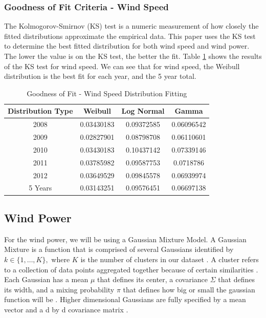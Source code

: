 \documentclass{IEEEtran}
\begin{document}
  \subsubsection{Goodness of Fit Criteria - Wind Speed}

  The Kolmogorov-Smirnov (KS) test is a numeric measurement of how closely the fitted distributions approximate the empirical data. This paper uses the KS test to determine the best fitted distribution for both wind speed and wind power. The lower the value is on the KS test, the better the fit. Table \ref{tab:distributions} shows the results of the KS test for wind speed. We can see that for wind speed, the Weibull distribution is the best fit for each year, and the 5 year total.

  \begin{table}
    \centering
    \caption{Goodness of Fit - Wind Speed Distribution Fitting}
    \begin{tabular}{c c c c}
      Distribution Type & Weibull & Log Normal & Gamma \\
      \hline
      2008 & 0.03430183 & 0.09372585 & 0.06096542 \\
      2009 & 0.02827901 & 0.08798708 & 0.06110601 \\
      2010 & 0.03430183 & 0.10437142 & 0.07339146 \\
      2011 & 0.03785982 & 0.09587753 & 0.0718786 \\
      2012 & 0.03649529 & 0.09845578 & 0.06939974 \\
      5 Years & 0.03143251 & 0.09576451 & 0.06697138
    \end{tabular}
    \label{tab:distributions}

  \end{table}

  \subsection{Wind Power}

  For the wind power, we will be using a Gaussian Mixture Model. A Gaussian Mixture is a function that is comprised of several Gaussians identified by $ k \in \{1, \ldots, K\}, $ where $ K $ is the number of clusters in our dataset \cite{carrasco_2020}. A cluster refers to a collection of data points aggregated together because of certain similarities \cite{carrasco_2020}. Each Gaussian has a mean $ \mu $ that defines its center, a covariance $ \Sigma $ that defines its width, and a mixing probability $ \pi $ that defines how big or small the gaussian function will be \cite{carrasco_2020}. Higher dimensional Gaussians are fully specified by a mean vector and a d by d covariance matrix \cite{ethen}.
\end{document}
